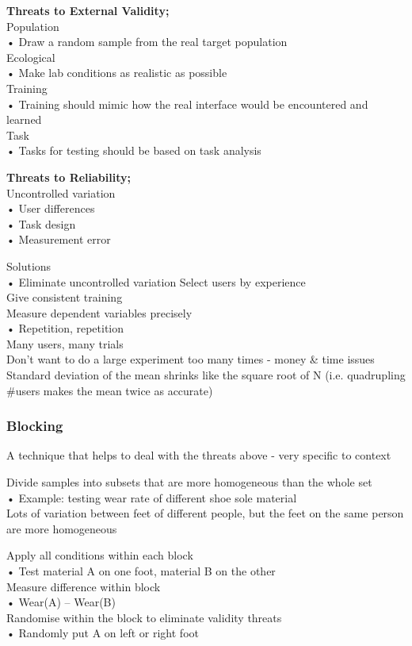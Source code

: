 \documentclass[]{project_plan}
\begin{document}
\textbf{Threats to External Validity;}\\
Population\\
• Draw a random sample from the real target population\\
Ecological\\
• Make lab conditions as realistic as possible\\
Training\\
• Training should mimic how the real interface would be encountered and learned\\
Task\\
• Tasks for testing should be based on task analysis

\newpage

\textbf{Threats to Reliability;}\\
Uncontrolled variation\\
• User differences\\
• Task design\\
• Measurement error

Solutions\\
• Eliminate uncontrolled variation Select users by experience\\
Give consistent training\\
Measure dependent variables precisely\\
• Repetition, repetition\\
Many users, many trials\\
Don't want to do a large experiment too many times - money \& time issues\\
Standard deviation of the mean shrinks like the square
root of N (i.e. quadrupling \#users makes the mean
twice as accurate)

\subsubsection{Blocking}
A technique that helps to deal with the threats above - very specific to context

Divide samples into subsets that are more homogeneous than the whole set\\
• Example: testing wear rate of different shoe sole material\\
Lots of variation between feet of different people, but the feet on the same person are more homogeneous

Apply all conditions within each block\\
• Test material A on one foot, material B on the other\\
Measure difference within block\\
• Wear(A) – Wear(B)\\
Randomise within the block to eliminate validity threats\\
• Randomly put A on left or right foot
\end{document}
